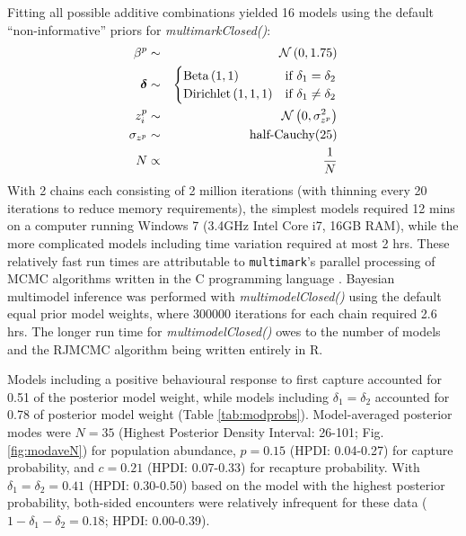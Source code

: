 \documentclass[12pt]{article}
\begin{document}
Fitting all possible additive combinations yielded 16 models using the default ``non-informative'' priors for \textit{multimarkClosed()}:
\begin{eqnarray*}
  \beta^p & \sim & {\cal N} \left( 0, 1.75 \right) \\
  \boldsymbol{\delta} & \sim & \begin{cases}
                                  \text{Beta} \left( 1, 1 \right) & \text{if } \delta_1 = \delta_2 \\
                                  \text{Dirichlet} \left( 1, 1, 1 \right) & \text{if } \delta_1 \ne \delta_2
                               \end{cases} \\
  z^p_i & \sim & {\cal N} \left( 0, \sigma^2_{z^p} \right) \\
  \sigma_{z^p} & \sim & \text{half-Cauchy}(25)\\
  N & \propto & \frac{1}{N}
\end{eqnarray*}
With 2 chains each consisting of 2 million iterations (with thinning every 20 iterations to reduce memory requirements), the simplest models required 12 mins on a computer running Windows 7 (3.4GHz Intel Core i7, 16GB RAM), while the more complicated models including time variation required at most 2 hrs. These relatively fast run times are attributable to \verb|multimark|'s parallel processing of MCMC algorithms written in the C programming language \citep{KernighanRitchie1988}. Bayesian multimodel inference was performed with \textit{multimodelClosed()} using the default equal prior model weights, where 300000 iterations for each chain required 2.6 hrs. The longer run time for \textit{multimodelClosed()} owes to the number of models and the RJMCMC algorithm being written entirely in R.

Models including a positive behavioural response to first capture accounted for 0.51 of the posterior model weight, while models including $\delta_1=\delta_2$ accounted for 0.78 of posterior model weight (Table \ref{tab:modprobs}). Model-averaged posterior modes were $N=35$ (Highest Posterior Density Interval: 26-101; Fig. \ref{fig:modaveN}) for population abundance, $p=0.15$ (HPDI: 0.04-0.27) for capture probability, and $c=0.21$ (HPDI: 0.07-0.33) for recapture probability. With $\delta_1=\delta_2=0.41$ (HPDI: 0.30-0.50) based on the model with the highest posterior probability, both-sided encounters were relatively infrequent for these data ($1-\delta_1-\delta_2=0.18$; HPDI: 0.00-0.39).
\end{document}
